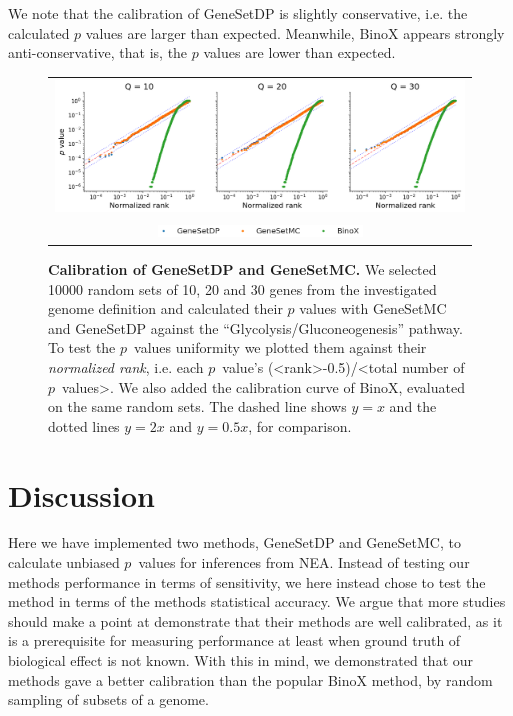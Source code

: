 \documentclass[a4paper,american]{lipics-v2016}
\begin{document}
We note that the calibration of GeneSetDP is slightly conservative, i.e. the calculated $p$ values are larger than expected. Meanwhile, BinoX appears strongly anti-conservative, that is, the $p$ values are lower than expected.

\begin{figure}[htb]
  \begin{center}
		  \begin{tabular}[t]{c}
				\includegraphics[width=1.0\textwidth]{figures/calibration_multiple.png} \\
				\includegraphics[width=0.5\textwidth]{figures/calibration_legend.png}
		\end{tabular}
  \end{center}
  \caption{{\bf Calibration of GeneSetDP and GeneSetMC.} We selected 10000 random sets of 10, 20 and 30 genes from the investigated genome definition and calculated their $p$ values with GeneSetMC and GeneSetDP against the ``Glycolysis/Gluconeogenesis'' pathway. To test the $p$~values uniformity we plotted them against their {\em normalized rank}, i.e. each $p$~value's (<rank>-0.5)/<total number of $p$~values>. We also added the calibration curve of BinoX, evaluated on the same random sets. The dashed line shows $y = x$ and the dotted lines $y = 2x$ and $y = 0.5x$, for comparison.}
  \label{fig:calibration}
\end{figure}


\section*{Discussion}

Here we have implemented two methods, GeneSetDP and GeneSetMC, to calculate unbiased $p$~values for inferences from NEA.
Instead of testing our methods performance in terms of sensitivity, we here instead chose to test the method in terms of the methods statistical accuracy. We argue that more studies should make a point at demonstrate that their methods are well calibrated, as it is a prerequisite for measuring performance at least when ground truth of biological effect is not known.
With this in mind, we demonstrated that our methods gave a better calibration than the popular BinoX method, by random sampling of subsets of a genome.
\end{document}
